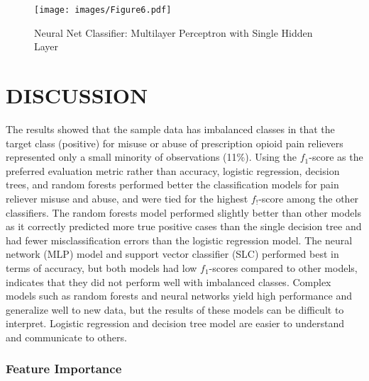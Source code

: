 \documentclass[sigconf]{acmart}
\begin{document}
\begin{figure}[!ht]
  \centering\texttt{[image: images/Figure6.pdf]}
  \caption{Neural Net Classifier: Multilayer Perceptron with Single Hidden Layer}
  \label{f:Figur6}
\end{figure}


\section{DISCUSSION}


The results showed that the sample data has imbalanced classes in that the 
target class (positive) for misuse or abuse of prescription opioid pain 
relievers represented only a small minority of observations (11\%). 
Using the $f_1$-score as the preferred evaluation metric rather than
accuracy, logistic regression, decision trees, and random forests performed 
better the classification models for pain reliever misuse and abuse, and
were tied for the highest $f_!$-score among the other classifiers. The 
random forests model performed slightly better than other models as it 
correctly predicted more true positive cases than the single decision tree 
and had fewer misclassification errors than the logistic regression model. 
The neural network (MLP) model and support vector classifier (SLC) 
performed best in terms of accuracy, but both models had low $f_1$-scores 
compared to other models, indicates that they did not perform well 
with imbalanced classes. Complex models such as random forests and 
neural networks yield high performance and generalize well to new data, 
but the results of these models can be difficult to interpret. Logistic 
regression and decision tree model are easier to understand and communicate
to others. 


\subsubsection{Feature Importance}
\end{document}
